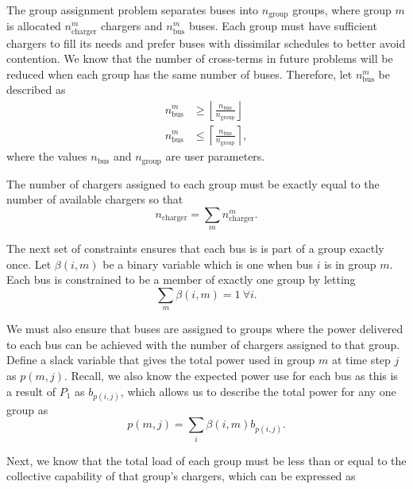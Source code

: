 \par The group assignment problem separates buses into $n_{\text{group}}$ groups, where group $m$ is allocated $n^m_{\text{charger}}$ chargers and $n^m_{\text{bus}}$ buses. Each group must have sufficient chargers to fill its needs and prefer buses with dissimilar schedules to better avoid contention. 
We know that the number of cross-terms in future problems will be reduced when each group has the same number of buses. Therefore, let $n^m_{\text{bus}}$ be described as
\begin{equation}\label{eqn:groups:nBusPerGroup}\begin{aligned}
	n^m_{\text{bus}} &\ge \left \lfloor \frac{n_{\text{bus}}}{n_{\text{group}}} \right \rfloor \\
	n^m_{\text{bus}} &\le \left \lceil \frac{n_{\text{bus}}}{n_{\text{group}}} \right \rceil,
\end{aligned}\end{equation}
where the values $n_\text{bus}$ and $n_\text{group}$ are user parameters.
\par The number of chargers assigned to each group must be exactly equal to the number of available chargers so that
\begin{equation}\label{eqn:groups:nTotalCharger}
	n_{\text{charger}} = \sum_mn_{\text{charger}}^m.
\end{equation}
\par The next set of constraints ensures that each bus is is part of a group exactly once. Let $\beta(i,m)$ be a binary variable which is one when bus $i$ is in group $m$. Each bus is constrained to be a member of exactly one group by letting
\begin{equation}\label{eqn:groups:groupId}
	\sum_m\beta(i,m) = 1 \ \forall i.
\end{equation}
\par We must also ensure that buses are assigned to groups where the power delivered to each bus can be achieved with the number of chargers assigned to that group. Define a slack variable that gives the total power used in group $m$ at time step $j$ as $p(m,j)$. Recall, we also know the expected power use for each bus as this is a result of $P_1$ as $b_{p(i,j)}$, which allows us to describe the total power for any one group as
\begin{equation}\label{eqn:groups:groupPower}
 p(m,j) = \sum_i\beta(i,m)b_{p(i,j)}.
\end{equation}
\par Next, we know that the total load of each group must be less than or equal to the collective capability of that group's chargers, which can be expressed as
